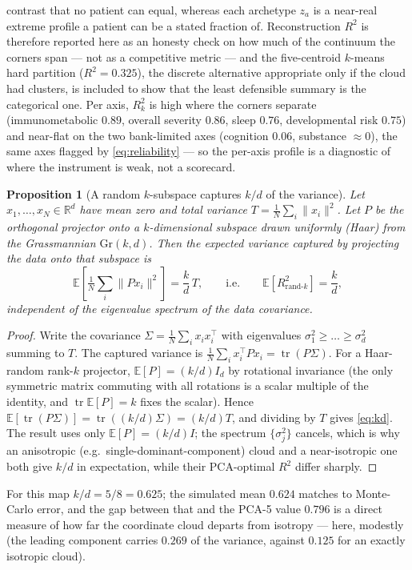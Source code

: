 \documentclass[11pt]{article}
\theoremstyle{plain}
\newtheorem{proposition}{Proposition}
\theoremstyle{definition}
\begin{document}
contrast that no patient can equal, whereas each archetype $z_a$ is a near-real extreme profile a
patient can be a stated fraction of. Reconstruction $R^2$ is therefore reported here as an honesty
check on how much of the continuum the corners span --- not as a competitive metric --- and the
five-centroid $k$-means hard partition ($R^2=0.325$), the discrete alternative appropriate only if
the cloud had clusters, is included to show that the least defensible summary is the categorical
one. Per axis, $R^2_k$ is high where the corners separate (immunometabolic $0.89$, overall
severity $0.86$, sleep $0.76$, developmental risk $0.75$) and near-flat on the two bank-limited
axes (cognition $0.06$, substance $\approx0$), the same axes flagged by \eqref{eq:reliability} ---
so the per-axis profile is a diagnostic of where the instrument is weak, not a scorecard.

\begin{proposition}[A random $k$-subspace captures $k/d$ of the variance]\label{prop:kd}
Let $x_1,\dots,x_N\in\mathbb R^d$ have mean zero and total variance
$T=\tfrac1N\sum_i\|x_i\|^2$. Let $P$ be the orthogonal projector onto a $k$-dimensional subspace
drawn uniformly (Haar) from the Grassmannian $\mathrm{Gr}(k,d)$. Then the expected variance
captured by projecting the data onto that subspace is
\begin{equation}
  \mathbb E\!\left[\tfrac1N\textstyle\sum_i\|Px_i\|^2\right]=\frac{k}{d}\,T,
  \qquad\text{i.e.}\qquad \mathbb E[R^2_{\text{rand-}k}]=\frac kd,
  \label{eq:kd}
\end{equation}
\emph{independent of the eigenvalue spectrum} of the data covariance.
\end{proposition}
\begin{proof}
Write the covariance $\Sigma=\tfrac1N\sum_i x_ix_i^\top$ with eigenvalues $\sigma_1^2\ge\dots\ge
\sigma_d^2$ summing to $T$. The captured variance is
$\tfrac1N\sum_i x_i^\top P x_i=\operatorname{tr}(P\Sigma)$. For a Haar-random rank-$k$ projector,
$\mathbb E[P]=(k/d)I_d$ by rotational invariance (the only symmetric matrix commuting with all
rotations is a scalar multiple of the identity, and $\operatorname{tr}\mathbb E[P]=k$ fixes the
scalar). Hence $\mathbb E[\operatorname{tr}(P\Sigma)]=\operatorname{tr}((k/d)\Sigma)=(k/d)T$, and
dividing by $T$ gives \eqref{eq:kd}. The result uses only $\mathbb E[P]=(k/d)I$; the spectrum
$\{\sigma_j^2\}$ cancels, which is why an anisotropic (e.g.\ single-dominant-component) cloud and a
near-isotropic one both give $k/d$ in expectation, while their PCA-optimal $R^2$ differ sharply.
\end{proof}
\noindent
For this map $k/d=5/8=0.625$; the simulated mean $0.624$ matches to Monte-Carlo error, and the
gap between that and the PCA-5 value $0.796$ is a direct measure of how far the coordinate cloud
departs from isotropy --- here, modestly (the leading component carries $0.269$ of the variance,
against $0.125$ for an exactly isotropic cloud).
\end{document}
